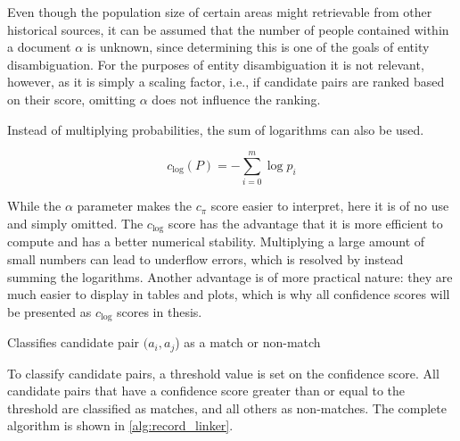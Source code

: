 Even though the population size of certain areas might retrievable from other historical sources, it can be assumed that the number of people contained within a document $\alpha$ is unknown, since determining this is one of the goals of entity disambiguation.
For the purposes of entity disambiguation it is not relevant, however, as it is simply a scaling factor, i.e., if candidate pairs are ranked based on their score, omitting $\alpha$ does not influence the ranking.

Instead of multiplying probabilities, the sum of logarithms can also be used.

\begin{equation}
    c_{\mathrm{log}}(P) = -\sum_{i=0}^{m} \log{p_i}
    \label{eq:confidence1}
\end{equation}

\noindent While the $\alpha$ parameter makes the $c_{\pi}$ score easier to interpret, here it is of no use and simply omitted.
The $c_{\mathrm{log}}$ score has the advantage that it is more efficient to compute and has a better numerical stability.
Multiplying a large amount of small numbers can lead to underflow errors, which is resolved by instead summing the logarithms.
Another advantage is of more practical nature: they are much easier to display in tables and plots, which is why all confidence scores will be presented as $c_{\mathrm{log}}$ scores in thesis.

\begin{algorithm}
    \caption{Classifies candidate pair $(a_i, a_j$) as a match or non-match}
    \label{alg:record_linker}
    
\end{algorithm}

To classify candidate pairs, a threshold value is set on the confidence score.
All candidate pairs that have a confidence score greater than or equal to the threshold are classified as matches, and all others as non-matches.
The complete algorithm is shown in \cref{alg:record_linker}.